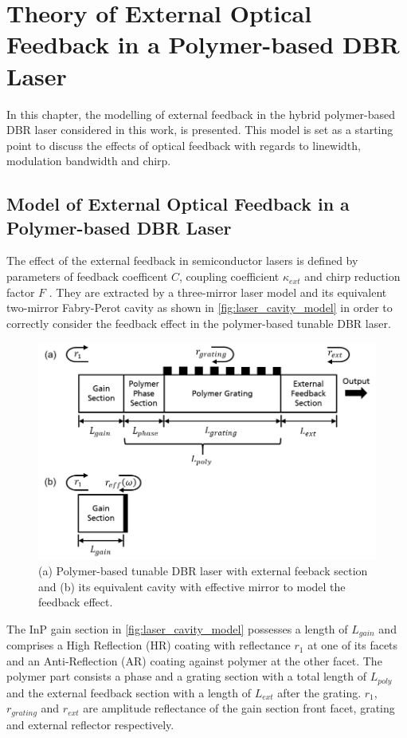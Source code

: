 \chapter{Theory of External Optical Feedback in a Polymer-based DBR Laser}\label{ch:Theory}
In this chapter, the modelling of external feedback in the hybrid polymer-based DBR laser considered in this work, is presented. This model is set as a starting point to discuss the effects of optical feedback with regards to linewidth, modulation bandwidth and chirp.

\section{Model of External Optical Feedback in a Polymer-based DBR Laser}\label{sec:model_laser}
The effect of the external feedback in semiconductor lasers is defined by parameters of feedback coefficent $C$, coupling coefficient $\kappa_{ext}$ and chirp reduction factor $F$ \cite{kazarinov1987relation, petermann2012laser}. They are extracted by a three-mirror laser model and its equivalent two-mirror Fabry-Perot cavity as shown in \autoref{fig:laser_cavity_model} in order to correctly consider the feedback effect in the polymer-based tunable DBR laser.

\begin{figure}[ht]
    \centering
    \includegraphics[width=.9\linewidth]{figures/laser_cavity_model.png}
    \caption{(a) Polymer-based tunable DBR laser with external feeback section and (b) its equivalent cavity with effective mirror to model the feedback effect.}
    \label{fig:laser_cavity_model}
\end{figure}

The InP gain section in \autoref{fig:laser_cavity_model} possesses a length of $L_{gain}$ and comprises a High Reflection (HR) coating with reflectance $r_1$ at one of its facets and an Anti-Reflection (AR) coating against polymer at the other facet. The polymer part consists a phase and a grating section with a total length of $L_{poly}$ and the external feedback section with a length of $L_{ext}$ after the grating. $r_1$, $r_{grating}$ and $r_{ext}$ are amplitude reflectance of the gain section front facet, grating and external reflector respectively.


